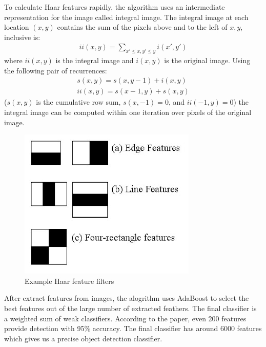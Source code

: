 \documentclass[10pt,twocolumn,letterpaper]{article}
\begin{document}
To calculate Haar features rapidly, the algorithm uses an intermediate representation for the image called integral image. The integral image at each location $(x, y)$ contains the sum of the pixels above and to the left of $x, y$, inclusive is:
\begin{align*}
ii(x, y) = \sum_{x' \leq x, y' \leq y} i(x', y')
\end{align*}
where $ii(x, y)$ is the integral image and $i(x, y)$ is the original image. Using the following pair of recurrences:
\begin{align*}
    s(x, y) = s(x, y-1) + i(x, y)\\
    ii(x, y) = s(x-1, y) + s(x, y)
\end{align*}
($s(x, y)$ is the cumulative row sum, $s(x, -1) = 0$, and $ii(-1, y) = 0$) the integral image can be computed within one iteration over pixels of the original image. \cite{Article02}

\begin{figure}[t]
\begin{center}
  \includegraphics[width=0.8\linewidth]{haar_features.jpg}
  \caption{Example Haar feature filters}
  \label{fig:haar-feature-filters}
\end{center}
\end{figure}

After extract features from images, the alogrithm uses AdaBoost to select the best features out of the large number of extracted feathers. The final classifier is a weighted sum of weak classifiers. According to the paper, even 200 features provide detection with 95\% accuracy. The final classifier has around 6000 features which gives us a precise object detection classifier.
\end{document}
